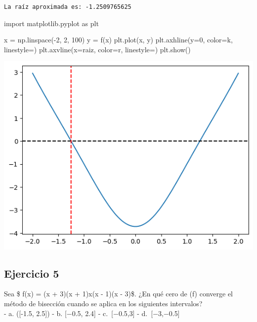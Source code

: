 \documentclass[
  letterpaper,
  DIV=11,
  numbers=noendperiod]{scrartcl}
\newenvironment{Shaded}{\begin{snugshade}}{\end{snugshade}}
\newcommand{\DecValTok}[1]{\textcolor[rgb]{0.68,0.00,0.00}{#1}}
\newcommand{\ImportTok}[1]{\textcolor[rgb]{0.00,0.46,0.62}{#1}}
\newcommand{\NormalTok}[1]{\textcolor[rgb]{0.00,0.23,0.31}{#1}}
\newcommand{\OperatorTok}[1]{\textcolor[rgb]{0.37,0.37,0.37}{#1}}
\newcommand{\StringTok}[1]{\textcolor[rgb]{0.13,0.47,0.30}{#1}}
\begin{document}
\begin{verbatim}
La raíz aproximada es: -1.2509765625
\end{verbatim}

\begin{Shaded}
\begin{Highlighting}[]
\ImportTok{import}\NormalTok{ matplotlib.pyplot }\ImportTok{as}\NormalTok{ plt}

\NormalTok{x }\OperatorTok{=}\NormalTok{ np.linspace(}\OperatorTok{{-}}\DecValTok{2}\NormalTok{, }\DecValTok{2}\NormalTok{, }\DecValTok{100}\NormalTok{)}
\NormalTok{y }\OperatorTok{=}\NormalTok{ f(x)}
\NormalTok{plt.plot(x, y)}
\NormalTok{plt.axhline(y}\OperatorTok{=}\DecValTok{0}\NormalTok{, color}\OperatorTok{=}\StringTok{\textquotesingle{}k\textquotesingle{}}\NormalTok{, linestyle}\OperatorTok{=}\StringTok{\textquotesingle{}{-}{-}\textquotesingle{}}\NormalTok{)}
\NormalTok{plt.axvline(x}\OperatorTok{=}\NormalTok{raiz, color}\OperatorTok{=}\StringTok{\textquotesingle{}r\textquotesingle{}}\NormalTok{, linestyle}\OperatorTok{=}\StringTok{\textquotesingle{}{-}{-}\textquotesingle{}}\NormalTok{)}
\NormalTok{plt.show()}
\end{Highlighting}
\end{Shaded}

\includegraphics{Deber3_files/figure-pdf/cell-5-output-1.png}

\subsection{Ejercicio 5}\label{ejercicio-5}

Sea \$ f(x) = (x + 3)(x + 1)x(x - 1)(x - 3)\$. ¿En qué cero de (f)
converge el método de bisección cuando se aplica en los siguientes
intervalos?\\
- a. ({[}-1.5, 2.5{]}) - b. {[}−0.5, 2.4{]} - c.~{[}−0.5,3{]} -
d.~{[}−3,−0.5{]}
\end{document}
